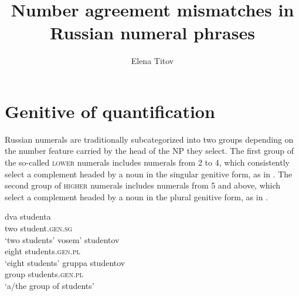 \documentclass[output=paper,
modfonts,
newtxmath,
hidelinks
]{langscibook}
\title{Number agreement mismatches in Russian numeral phrases}
\author{%
 Elena Titov\affiliation{University College London}}
\begin{document}
\maketitle

\section{Genitive of quantification}\label{18:s1}

Russian numerals are traditionally subcategorized into two groups depending on the number feature carried by the head of the NP they select. The first group of the so-called \textsc{lower} numerals includes numerals from 2 to 4, which consistently select a complement headed by a noun in the singular genitive form, as in . The second group of \textsc{higher} numerals includes numerals from 5 and above, which select a complement headed by a noun in the plural genitive form, as in . 

\begin{multicols}{2}
\ea \label{18:ex1}
\gll dva   studenta\\
     two  student.\textsc{gen.sg}\\
\glt `two students'
\z
\columnbreak
\ea \label{18:ex2}
\gll vosem’  studentov\\
     eight  students.\textsc{gen.pl}\\
\glt `eight students'
\z
\columnbreak
\ea \label{18:ex3}
\gll gruppa  studentov\\
     group   students.\textsc{gen.pl}\\
\glt `a/the group of students'
\z
\end{multicols}
\end{document}
